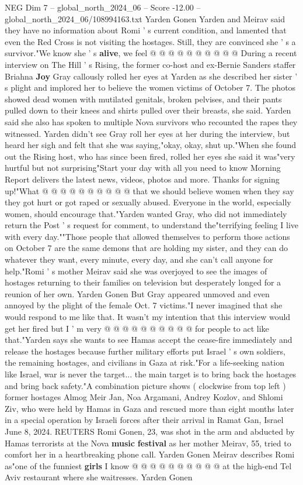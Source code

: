 \begin{textsample}{NEG Dim 7 – global\_north\_2024\_06 – Score -12.00 – global\_north\_2024\_06/108994163.txt}
Yarden Gonen Yarden and Meirav said they have no information about Romi ' s current condition, and lamented that even the Red Cross is not visiting the hostages.
Still, they are convinced she ' s a survivor."We know she ' s \textbf{alive}, we feel @ @ @ @ @ @ @ @ @ @ During a recent interview on The Hill ' s Rising, the former co-host and ex-Bernie Sanders staffer Briahna \textbf{Joy} Gray callously rolled her eyes at Yarden as she described her sister ' s plight and implored her to believe the women victims of October 7.
The photos showed dead women with mutilated genitals, broken pelvises, and their pants pulled down to their knees and shirts pulled over their breasts, she said.
Yarden said she also has spoken to multiple Nova survivors who recounted the rapes they witnessed.
Yarden didn't see Gray roll her eyes at her during the interview, but heard her sigh and felt that she was saying,"okay, okay, shut up."When she found out the Rising host, who has since been fired, rolled her eyes she said it was"very hurtful but not surprising"Start your day with all you need to know Morning Report delivers the latest news, videos, photos and more.
Thanks for signing up!"What @ @ @ @ @ @ @ @ @ @ that we should believe women when they say they got hurt or got raped or sexually abused.
Everyone in the world, especially women, should encourage that."Yarden wanted Gray, who did not immediately return the Post ' s request for comment, to understand the"terrifying feeling I live with every day.""Those people that allowed themselves to perform those actions on October 7 are the same demons that are holding my sister, and they can do whatever they want, every minute, every day, and she can't call anyone for help."Romi ' s mother Meirav said she was overjoyed to see the images of hostages returning to their families on television but desperately longed for a reunion of her own.
Yarden Gonen But Gray appeared unmoved and even annoyed by the plight of the female Oct. 7 victims."I never imagined that she would respond to me like that.
It wasn't my intention that this interview would get her fired but I ' m very @ @ @ @ @ @ @ @ @ @ for people to act like that."Yarden says she wants to see Hamas accept the cease-fire immediately and release the hostages because further military efforts put Israel ' s own soldiers, the remaining hostages, and civilians in Gaza at risk."For a life-seeking nation like Israel, war is never the target... the main target is to bring back the hostages and bring back safety."A combination picture shows ( clockwise from top left ) former hostages Almog Meir Jan, Noa Argamani, Andrey Kozlov, and Shlomi Ziv, who were held by Hamas in Gaza and rescued more than eight months later in a special operation by Israeli forces after their arrival in Ramat Gan, Israel June 8, 2024.
REUTERS Romi Gonen, 23, was shot in the arm and abducted by Hamas terrorists at the Nova \textbf{music} \textbf{festival} as her mother Meirav, 55, tried to comfort her in a heartbreaking phone call.
Yarden Gonen Meirav describes Romi as"one of the funniest \textbf{girls} I know @ @ @ @ @ @ @ @ @ @ at the high-end Tel Aviv restaurant where she waitresses.
Yarden Gonen


\end{textsample}
